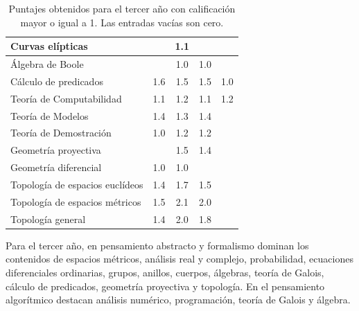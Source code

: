 \begin{refsection}
\begin{table}[H]
\begin{center}
\begin{tabular}{|l|c|c|c|c|}
Curvas elípticas &  & 1.1 &  &  \\ \hline
Álgebra de Boole &  & 1.0 & 1.0 &  \\ \hline
Cálculo de predicados & 1.6 & 1.5 & 1.5 & 1.0 \\ \hline
Teoría de Computabilidad & 1.1 & 1.2 & 1.1 & 1.2 \\ \hline
Teoría de Modelos & 1.4 & 1.3 & 1.4 &  \\ \hline
Teoría de Demostración & 1.0 & 1.2 & 1.2 &  \\ \hline
Geometría proyectiva &  & 1.5 & 1.4 &  \\ \hline
Geometría diferencial & 1.0 & 1.0 &  &  \\ \hline
Topología de espacios euclídeos & 1.4 & 1.7 & 1.5 &  \\ \hline
Topología de espacios métricos & 1.5 & 2.1 & 2.0 &  \\ \hline
Topología general & 1.4 & 2.0 & 1.8 &  \\ \hline
\end{tabular}
\end{center}
\caption{Puntajes obtenidos para el tercer año con calificación mayor o igual a 1. Las entradas vacías son cero.} \label{Terceranno}
\end{table}

Para el tercer año, en pensamiento abstracto y formalismo dominan los contenidos de espacios métricos, análisis real y complejo, probabilidad, ecuaciones diferenciales ordinarias, grupos, anillos, cuerpos, álgebras, teoría de Galois, cálculo de predicados, geometría proyectiva y topología. En el pensamiento algorítmico destacan análisis numérico, programación, teoría de Galois y álgebra.


\end{refsection}
